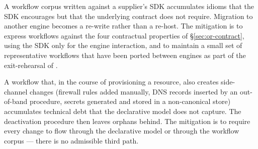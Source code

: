 \begin{pitfallbox}
\noindent A workflow corpus written against a supplier's SDK
accumulates idioms that the SDK encourages but that the underlying
contract does not require. Migration to another engine becomes a
re-write rather than a re-host. The mitigation is to express
workflows against the four contractual properties of
\S\ref{sec:or-contract}, using the SDK only for the engine
interaction, and to maintain a small set of representative
workflows that have been ported between engines as part of the
exit-rehearsal of .
\end{pitfallbox}

\begin{pitfallbox}
\noindent A workflow that, in the course of provisioning a
resource, also creates side-channel changes (firewall rules added
manually, DNS records inserted by an out-of-band procedure,
secrets generated and stored in a non-canonical store)
accumulates technical debt that the declarative model does not
capture. The deactivation procedure then leaves orphans behind.
The mitigation is to require every change to flow through the
declarative model or through the workflow corpus --- there is no
admissible third path.
\end{pitfallbox}

